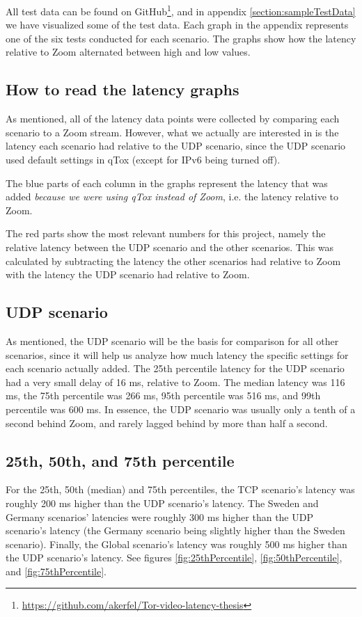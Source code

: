 \documentclass{kththesis}
\begin{document}
All test data can be found on GitHub\footnote{\url{https://github.com/akerfel/Tor-video-latency-thesis}}, and in appendix \ref{section:sampleTestData} we have visualized some of the test data. Each graph in the appendix represents one of the six tests conducted for each scenario. The graphs show how the latency relative to Zoom alternated between high and low values.

\subsection{How to read the latency graphs}
As mentioned, all of the latency data points were collected by comparing each scenario to a Zoom stream. However, what we actually are interested in is the latency each scenario had relative to the UDP scenario, since the UDP scenario used default settings in qTox (except for IPv6 being turned off). 

The blue parts of each column in the graphs represent the latency that was added \emph{because we were using qTox instead of Zoom}, i.e. the latency relative to Zoom.

The red parts show the most relevant numbers for this project, namely the relative latency between the UDP scenario and the other scenarios. This was calculated by subtracting the latency the other scenarios had relative to Zoom with the latency the UDP scenario had relative to Zoom.

\subsection{UDP scenario}
As mentioned, the UDP scenario will be the basis for comparison for all other scenarios, since it will help us analyze how much latency the specific settings for each scenario actually added. The 25th percentile latency for the UDP scenario had a very small delay of 16 ms, relative to Zoom. The median latency was 116 ms, the 75th percentile was 266 ms, 95th percentile was 516 ms, and 99th percentile was 600 ms. In essence, the UDP scenario was usually only a tenth of a second behind Zoom, and rarely lagged behind by more than half a second.

\subsection{25th, 50th, and 75th percentile}
For the 25th, 50th (median) and 75th percentiles, the TCP scenario's latency was roughly 200 ms higher than the UDP scenario's latency. The Sweden and Germany scenarios' latencies were roughly 300 ms higher than the UDP scenario's latency (the Germany scenario being slightly higher than the Sweden scenario). Finally, the Global scenario's latency was roughly 500 ms higher than the UDP scenario's latency. See figures \ref{fig:25thPercentile}, \ref{fig:50thPercentile}, and \ref{fig:75thPercentile}.
\end{document}
